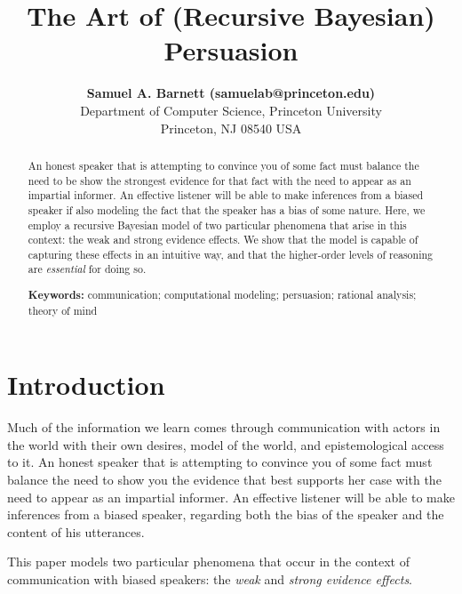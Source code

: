 \documentclass[10pt,letterpaper]{article}
\title{The Art of (Recursive Bayesian) Persuasion}
\author{{\large \bf Samuel A. Barnett (samuelab@princeton.edu)} \\
  Department of Computer Science, Princeton University \\
  Princeton, NJ 08540 USA}
\begin{document}
\maketitle


\begin{abstract}
An honest speaker that is attempting to convince you of some fact must balance
the need to be show the strongest evidence for that fact with the need to appear as an impartial informer. An effective listener
will be able to make inferences from a biased speaker if also modeling the fact that
the speaker has a bias of some nature. Here, we employ a recursive Bayesian model
of two particular phenomena that arise in this context: the weak and strong evidence effects.
We show that the model is capable of capturing these effects in an intuitive way, and that the
higher-order levels of reasoning are \textit{essential} for doing so.

\textbf{Keywords:} 
communication; computational modeling; persuasion; rational analysis; theory of mind
\end{abstract}

\section{Introduction}
\begin{epigraphs}
\end{epigraphs}

Much of the information we learn comes through communication with actors 
in the world with their own desires, model of the world, and epistemological access to it. An honest speaker 
that is attempting to convince you of some fact must balance the need to show you
the evidence that best supports her case
with the need to appear as an impartial informer. An effective listener will be able to 
make inferences from a biased speaker, regarding both the bias of the speaker and the
content of his utterances.

This paper models two particular phenomena that occur in the context of communication
with biased speakers: the \textit{weak} and \textit{strong evidence effects}. 
\end{document}
